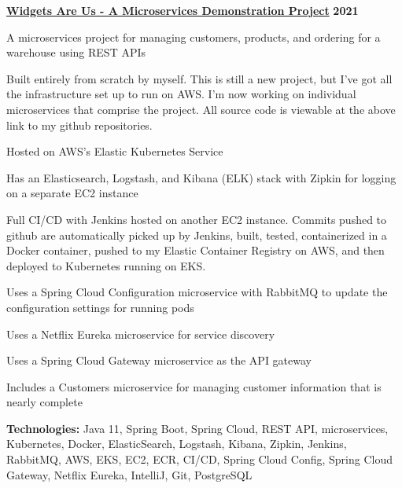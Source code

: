 %
    \headerrow
        {\textbf{\href{https://github.com/johatfie/widgets-are-us}{Widgets Are Us - A Microservices Demonstration Project}}}
        {\textbf{2021}}
    \begin{itemize*}
        \item A microservices project for managing customers, products, and ordering for a warehouse using REST APIs
        \item Built entirely from scratch by myself.  This is still a new project, but I've got all the infrastructure set up to run
            on AWS.  I'm now working on individual microservices that comprise the project.  All source code is viewable
            at the above link to my github repositories.
        \item Hosted on AWS's Elastic Kubernetes Service
        \item Has an Elasticsearch, Logstash, and Kibana (ELK) stack with Zipkin for logging on a separate EC2 instance
        \item Full CI/CD with Jenkins hosted on another EC2 instance.  Commits pushed to github are automatically picked up by
            Jenkins, built, tested, containerized in a Docker container, pushed to my Elastic Container Registry on AWS, and then
            deployed to Kubernetes running on EKS.
        \item Uses a Spring Cloud Configuration microservice with RabbitMQ to update the configuration settings for running pods
        \item Uses a Netflix Eureka microservice for service discovery
        \item Uses a Spring Cloud Gateway microservice as the API gateway
        \item Includes a Customers microservice for managing customer information that is nearly complete
    \end{itemize*}

    \hspace{1.0em}
        {\textbf{Technologies:} Java 11, Spring Boot, Spring Cloud, REST API, microservices, Kubernetes, Docker, ElasticSearch,
        Logstash, Kibana, Zipkin, Jenkins, RabbitMQ, AWS, EKS, EC2, ECR, CI/CD, Spring Cloud Config, Spring Cloud Gateway,
        Netflix Eureka, IntelliJ, Git, PostgreSQL}


